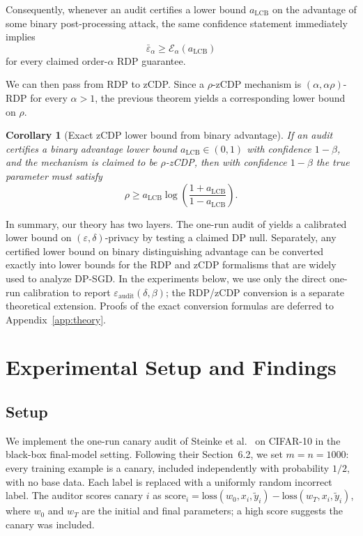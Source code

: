 \documentclass[10pt]{article}
\newtheorem{corollary}[theorem]{Corollary}
\newcommand{\eps}{\varepsilon}
\newcommand{\del}{\delta}
\newcommand{\epsbar}{\bar\varepsilon}
\begin{document}
Consequently, whenever an audit certifies a lower bound $a_{\mathrm{LCB}}$ on the advantage of some binary post-processing attack, the same confidence statement immediately implies
\[
\epsbar_\alpha \ge \mathcal E_\alpha(a_{\mathrm{LCB}})
\]
for every claimed order-$\alpha$ RDP guarantee.

We can then pass from RDP to zCDP. Since a $\rho$-zCDP mechanism is $(\alpha,\alpha\rho)$-RDP for every $\alpha>1$, the previous theorem yields a corresponding lower bound on $\rho$.

\begin{corollary}[Exact zCDP lower bound from binary advantage]
\label{cor:zcdp}
If an audit certifies a binary advantage lower bound $a_{\mathrm{LCB}}\in(0,1)$ with confidence $1-\beta$, and the mechanism is claimed to be $\rho$-zCDP, then with confidence $1-\beta$ the true parameter must satisfy
\[
\rho \ge a_{\mathrm{LCB}}\log\!\left(\frac{1+a_{\mathrm{LCB}}}{1-a_{\mathrm{LCB}}}\right).
\]
\end{corollary}

In summary, our theory has two layers. The one-run audit of \cite{steinke2023privacy} yields a calibrated lower bound on $(\eps,\del)$-privacy by testing a claimed DP null. Separately, any certified lower bound on binary distinguishing advantage can be converted exactly into lower bounds for the RDP and zCDP formalisms that are widely used to analyze DP-SGD. In the experiments below, we use only the direct one-run calibration to report $\eps_{\mathrm{audit}}(\del,\beta)$; the RDP/zCDP conversion is a separate theoretical extension. Proofs of the exact conversion formulas are deferred to Appendix~\ref{app:theory}.

\section{Experimental Setup and Findings}

\subsection{Setup}

We implement the one-run canary audit of Steinke et al.~\cite{steinke2023privacy} on CIFAR-10 in the black-box final-model setting. Following their Section~6.2, we set $m = n = 1000$: every training example is a canary, included independently with probability $1/2$, with no base data. Each label is replaced with a uniformly random incorrect label. The auditor scores canary $i$ as
$\mathrm{score}_i = \mathrm{loss}(w_0, x_i, \tilde y_i) - \mathrm{loss}(w_T, x_i, \tilde y_i)$,
where $w_0$ and $w_T$ are the initial and final parameters; a high score suggests the canary was included.
\end{document}
